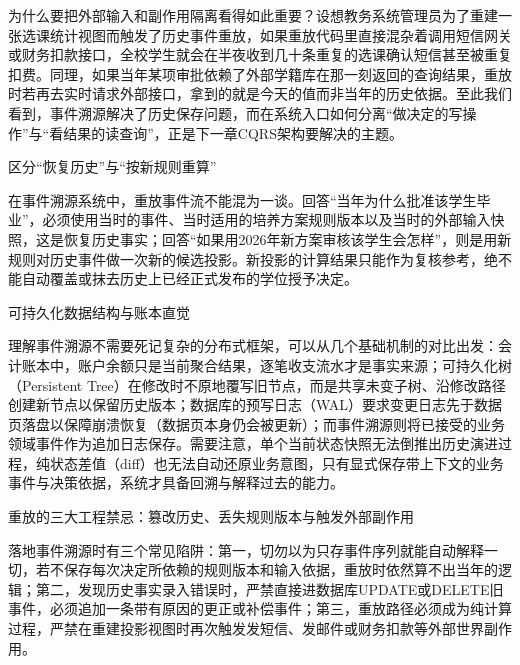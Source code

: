 \documentclass[UTF8,a4paper,11pt,fontset=fandol]{ctexart}
\begin{document}
为什么要把外部输入和副作用隔离看得如此重要？设想教务系统管理员为了重建一张选课统计视图而触发了历史事件重放，如果重放代码里直接混杂着调用短信网关或财务扣款接口，全校学生就会在半夜收到几十条重复的选课确认短信甚至被重复扣费。同理，如果当年某项审批依赖了外部学籍库在那一刻返回的查询结果，重放时若再去实时请求外部接口，拿到的就是今天的值而非当年的历史依据。至此我们看到，事件溯源解决了历史保存问题，而在系统入口如何分离“做决定的写操作”与“看结果的读查询”，正是下一章CQRS架构要解决的主题。

\begin{importantbox}{区分“恢复历史”与“按新规则重算”}

在事件溯源系统中，重放事件流不能混为一谈。回答“当年为什么批准该学生毕业”，必须使用当时的事件、当时适用的培养方案规则版本以及当时的外部输入快照，这是恢复历史事实；回答“如果用2026年新方案审核该学生会怎样”，则是用新规则对历史事件做一次新的候选投影。新投影的计算结果只能作为复核参考，绝不能自动覆盖或抹去历史上已经正式发布的学位授予决定。

\end{importantbox}

\begin{knowledgebox}{可持久化数据结构与账本直觉}

理解事件溯源不需要死记复杂的分布式框架，可以从几个基础机制的对比出发：会计账本中，账户余额只是当前聚合结果，逐笔收支流水才是事实来源；可持久化树（Persistent Tree）在修改时不原地覆写旧节点，而是共享未变子树、沿修改路径创建新节点以保留历史版本；数据库的预写日志（WAL）要求变更日志先于数据页落盘以保障崩溃恢复（数据页本身仍会被更新）；而事件溯源则将已接受的业务领域事件作为追加日志保存。需要注意，单个当前状态快照无法倒推出历史演进过程，纯状态差值（diff）也无法自动还原业务意图，只有显式保存带上下文的业务事件与决策依据，系统才具备回溯与解释过去的能力。

\end{knowledgebox}

\begin{warningbox}{重放的三大工程禁忌：篡改历史、丢失规则版本与触发外部副作用}

落地事件溯源时有三个常见陷阱：第一，切勿以为只存事件序列就能自动解释一切，若不保存每次决定所依赖的规则版本和输入依据，重放时依然算不出当年的逻辑；第二，发现历史事实录入错误时，严禁直接进数据库UPDATE或DELETE旧事件，必须追加一条带有原因的更正或补偿事件；第三，重放路径必须成为纯计算过程，严禁在重建投影视图时再次触发发短信、发邮件或财务扣款等外部世界副作用。

\end{warningbox}
\end{document}
